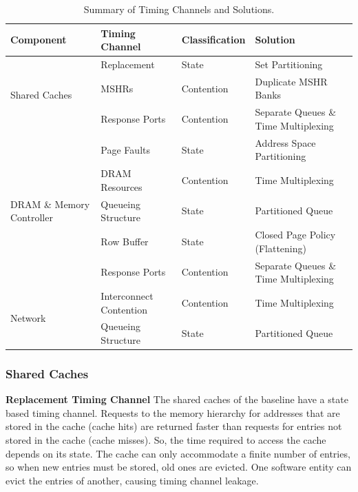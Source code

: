 \def\novelcolor{Green}
\begin{table}
\begin{tabular}{l|l|l|l}
    \hline
    Component & Timing Channel & Classification & Solution\\
    \hline
    \multirow{3}{*}{Shared Caches}
    & Replacement & State  & Set Partitioning \\
    \hhline{~---}
    & {\color{\novelcolor}MSHRs}
    & {\color{\novelcolor}Contention }
    & {\color{\novelcolor}Duplicate MSHR Banks} \\
    \hhline{~---}
    & {\color{\novelcolor}Response Ports}
    & {\color{\novelcolor}Contention }
    & {\color{\novelcolor}Separate Queues \& Time Multiplexing}\\
    \hline
    \multirow{5}{*}{DRAM \& Memory Controller}
    & Page Faults & State  & Address Space Partitioning \\
    \hhline{~---}
    & DRAM Resources & Contention  & Time Multiplexing \\
    \hhline{~---}
    & Queueing Structure & State  & Partitioned Queue \\
    \hhline{~---}
    & Row Buffer & State & Closed Page Policy (Flattening)\\
    \hhline{~---}
    & {\color{\novelcolor} Response Ports} 
    & {\color{\novelcolor} Contention }
    & {\color{\novelcolor} Separate Queues \& Time Multiplexing}\\
    \hline
    \multirow{2}{*}{Network} 
    & Interconnect Contention & Contention & Time Multiplexing \\
    \hhline{~---}
    & Queueing Structure & State & Partitioned Queue \\
\end{tabular}
    \caption{Summary of Timing Channels and Solutions.}
    \label{table:timing_chan_summary}
\end{table}

\subsubsection{Shared Caches}
\mbox{}\newline
\textbf{Replacement Timing Channel}
The shared caches of the baseline have a state based timing channel. Requests 
to the memory hierarchy for addresses that are stored in the cache (cache hits) 
are returned faster than requests for entries not stored in the cache (cache 
misses). So, the time required to access the cache depends on its state. The 
cache can only accommodate a finite number of entries, so when new entries must 
be stored, old ones are evicted. One software entity can evict the entries of 
another, causing timing channel leakage.

